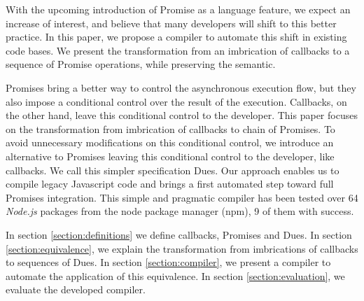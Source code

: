 With the upcoming introduction of Promise as a language feature, we expect an increase of interest, and believe that many developers will shift to this better practice.
In this paper, we propose a compiler to automate this shift in existing code bases.
We present the transformation from an imbrication of callbacks to a sequence of Promise operations, while preserving the semantic.

Promises bring a better way to control the asynchronous execution flow, but they also impose a conditional control over the result of the execution.
Callbacks, on the other hand, leave this conditional control to the developer.
This paper focuses on the transformation from imbrication of callbacks to chain of Promises.
To avoid unnecessary modifications on this conditional control, we introduce an alternative to Promises leaving this conditional control to the developer, like callbacks.
We call this simpler specification Dues.
Our approach enables us to compile legacy Javascript code and brings a first automated step toward full Promises integration.
This simple and pragmatic compiler has been tested over 64 \textit{Node.js} packages from the node package manager (npm), 9 of them with success.

In section \ref{section:definitions} we define callbacks, Promises and Dues.
In section \ref{section:equivalence}, we explain the transformation from imbrications of callbacks to sequences of Dues.
In section \ref{section:compiler}, we present a compiler to automate the application of this equivalence.
In section \ref{section:evaluation}, we evaluate the developed compiler.




